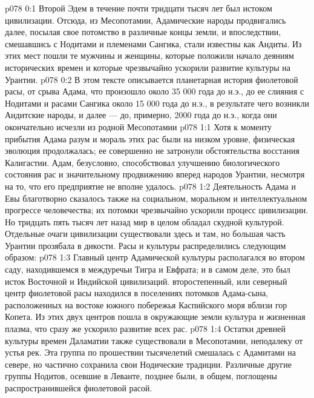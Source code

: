 \author{Архангел}
\vs p078 0:1 Второй Эдем в течение почти тридцати тысяч лет был истоком цивилизации. Отсюда, из Месопотамии, Адамические народы продвигались далее, посылая свое потомство в различные концы земли, и впоследствии, смешавшись с Нодитами и племенами Сангика, стали известны как Андиты. Из этих мест пошли те мужчины и женщины, которые положили начало деяниям исторических времен и которые чрезвычайно ускорили развитие культуры на Урантии.
\vs p078 0:2 В этом тексте описывается планетарная история фиолетовой расы, от срыва Адама, что произошло около 35 000 года до н.э., до ее слияния с Нодитами и расами Сангика около 15 000 года до н.э., в результате чего возникли Андитские народы, и далее --- до, примерно, 2000 года до н.э., когда они окончательно исчезли из родной Месопотамии
\vs p078 1:1 Хотя к моменту прибытия Адама разум и мораль этих рас были на низком уровне, физическая эволюция продолжалась; ее совершенно не затронули обстоятельства восстания Калигастии. Адам, безусловно, способствовал улучшению биологического состояния рас и значительному продвижению вперед народов Урантии, несмотря на то, что его предприятие не вполне удалось.
\vs p078 1:2 Деятельность Адама и Евы благотворно сказалось также на социальном, моральном и интеллектуальном прогрессе человечества; их потомки чрезвычайно ускорили процесс цивилизации. Но тридцать пять тысяч лет назад мир в целом обладал скудной культурой. Отдельные очаги цивилизации существовали здесь и там, но большая часть Урантии прозябала в дикости. Расы и культуры распределились следующим образом:
\vs p078 1:3 \bibnobreakspace {} Главный центр Адамической культуры располагался во втором саду, находившемся в междуречьи Тигра и Евфрата; и в самом деле, это был исток Восточной и Индийской цивилизаций. второстепенный, или северный центр фиолетовой расы находился в поселениях потомков Адама\hyp{}сына, расположенных на востоке южного побережья Каспийского моря вблизи гор Копета. Из этих двух центров пошла в окружающие земли культура и жизненная плазма, что сразу же ускорило развитие всех рас.
\vs p078 1:4 \pc {}\bibnobreakspace {} Остатки древней культуры времен Даламатии также существовали в Месопотамии, неподалеку от устья рек. Эта группа по прошествии тысячелетий смешалась с Адамитами на севере, но частично сохранила свои Нодические традиции. Различные другие группы Нодитов, осевшие в Леванте, позднее были, в общем, поглощены распространившейся фиолетовой расой.
